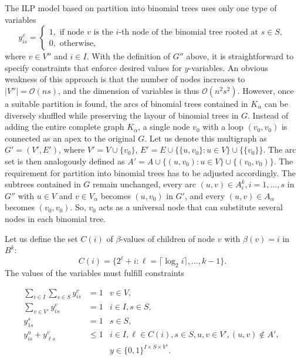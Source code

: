The ILP model based on partition into binomial trees uses only one type of variables
$$
y_{is}^v=\begin{cases}
1, \text{ if  node } v \text{ is the } i\text{-th node of the binomial tree rooted at } s\in S,\\
0, \text{ otherwise},
\end{cases}
$$
where $v\in V''$ and $i\in I $. 
With the definition of $G''$ above, it is straightforward to specify constraints that enforce desired values for $y$-variables.
An obvious weakness of this approach is  that the number of nodes increases to $|V''|=\mathcal{O}(ns)$, and the dimension of variables is thus $\mathcal{O}(n^2s^2)$.
However, once a suitable partition is found, the arcs of binomial trees contained in $K_\alpha$ can be diversely shuffled while preserving the layour of binomial trees in $G$.
Instead of adding the entire complete graph $K_\alpha$, a single node $v_0$ with a loop $(v_0,v_0)$ is connected as an apex to the original $G$.
Let us denote this multigraph as $G'=(V',E')$, where $V'=V\cup\{v_0\}$, $E'=E\cup\{\{u,v_0\}:u\in V\}\cup\{\{v_0\}\}$. 
The arc set is then analogously defined as $A'=A\cup\{(u,v_0): u\in V\}\cup\{(v_0,v_0)\}$.
The requirement for partition into binomial trees has to be adjusted accordingly.
The subtrees contained in $G$ remain unchanged, every arc $(u,v)\in A^k_i, i=1,\dots,s$ in $G''$ with $u\in V$ and $v\in V_\alpha$ becomes $(u,v_0)$ in $G'$,
and every $(u,v)\in A_\alpha$ becomes $(v_0,v_0)$.
So, $v_0$ acts as a universal node that can substitute several nodes in each binomial tree.

Let us define the set $C(i)$ of $\beta$-values of children of node $v$ with $\beta(v)=i$ in $B^k$:
\begin{equation}
C(i)=\{2^\ell+i:\ell=\lceil\log_2 i\rceil,\dots,k-1\}.
\end{equation}
The values of the variables must fulfill constraints

\begin{subequations}\label{mod:partition}
\begin{align}
\label{mod:part:nodeBelongs} \sum\limits_{i\in I}\sum\limits_{s\in S}y^v_{is} & = 1 & v\in V,\\
\label{mod:part:treeHasIJ} \sum\limits_{v\in V'}y^v_{is} & = 1 & i\in I,s\in S,\\
\label{mod:part:source1} y_{1s}^s & = 1  & s\in S,\\
\label{mod:part:followArcs} y^u_{is}+y^v_{\ell s} &\leq 1 & i\in I,\ell\in C(i), s\in S, u,v\in V',(u,v)\not\in A',\\
\label{mod:part:dim}&&y \in \{0,1\}^{I\times S\times V'}.
\end{align}~
\end{subequations}

